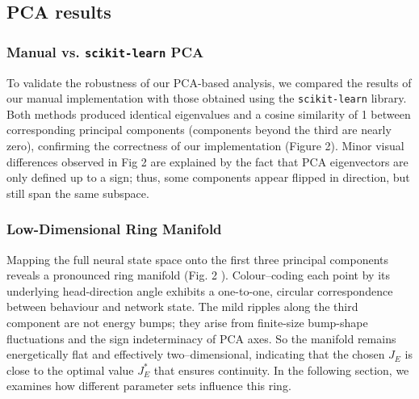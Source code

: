 \documentclass[11pt,a4paper]{article}
\begin{document}
\subsection{PCA results}

\subsubsection*{Manual vs. \texttt{scikit-learn} PCA}

To validate the robustness of our PCA-based analysis, we compared the results of our manual implementation with those obtained using the \texttt{scikit-learn} library. 
Both methods produced identical eigenvalues and a cosine similarity of 1 between corresponding principal components (components beyond the third are nearly zero), confirming the correctness of our implementation (Figure 2). Minor visual differences observed in Fig 2 are explained by the fact that PCA eigenvectors are only defined up to a sign; thus, some components appear flipped in direction, but still span the same subspace.




\subsubsection*{Low-Dimensional Ring Manifold}

Mapping the full neural state space onto the first three principal components reveals a pronounced ring manifold (Fig. 2 ).
Colour–coding each point by its underlying head-direction angle exhibits a one-to-one, circular correspondence between behaviour and network state. 
The mild ripples along the third component are not energy bumps; they arise from finite-size bump-shape fluctuations and the sign indeterminacy of PCA axes. 
So the manifold remains energetically flat and effectively two–dimensional, indicating that the chosen $J_E$ is close to the optimal value $J_E^{\ast}$ that ensures continuity. 
In the following section, we examines how different parameter sets influence this ring.
\end{document}
